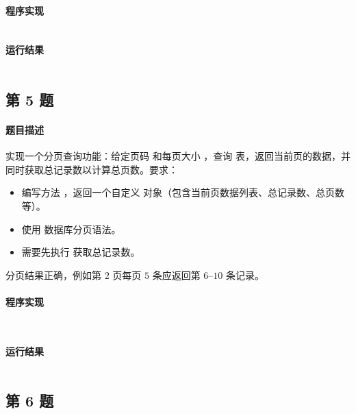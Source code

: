 \documentclass{academics}
\begin{document}
\paragraph{程序实现} {
    \inputminted[label=BatchInsert.java]{java}{../src/P04/BatchInsert.java}
}

\paragraph{运行结果} {
    \inputminted{text}{../res/P04.out}
}

\subsection{第 5 题}

\paragraph{题目描述} {
    实现一个分页查询功能：给定页码  和每页大小 ，查询  表，返回当前页的数据，并同时获取总记录数以计算总页数。要求：
    \begin{itemize}
        \item 编写方法 ，返回一个自定义  对象（包含当前页数据列表、总记录数、总页数等）。
        \item 使用  数据库分页语法。
        \item 需要先执行  获取总记录数。
    \end{itemize}
    分页结果正确，例如第 $2$ 页每页 $5$ 条应返回第 $6$--$10$ 条记录。
}

\paragraph{程序实现} {
    \inputminted[label=PageResult.java]{java}{../src/P05/PageResult.java}
    \inputminted[label=PageQuery.java]{java}{../src/P05/PageQuery.java}
}

\paragraph{运行结果} {
    \inputminted{text}{../res/P05.out}
}

\subsection{第 6 题}
\end{document}
